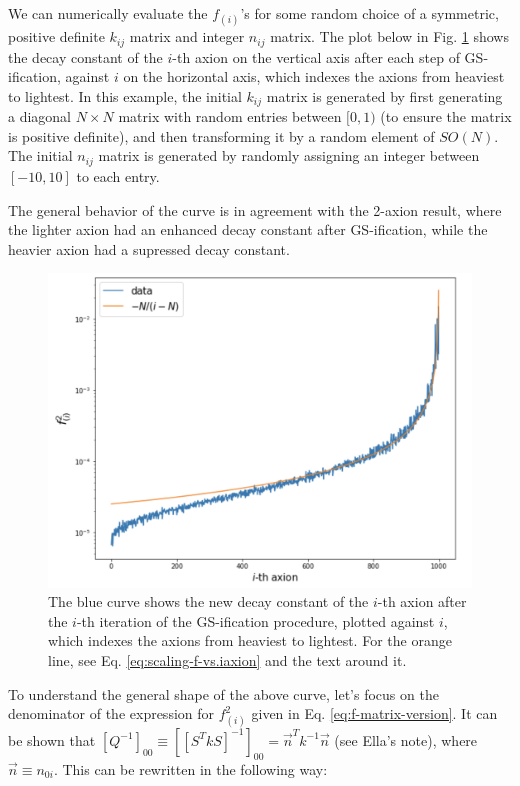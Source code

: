 \documentclass{article}
\begin{document}
We can numerically evaluate the $f_{(i)}$'s for some random choice of a symmetric, positive definite $k_{ij}$ matrix and integer $n_{ij}$ matrix. The plot below in Fig. \ref{fig:f-vs-axions} shows the decay constant of the $i$-th axion on the vertical axis after each step of GS-ification, against $i$ on the horizontal axis, which indexes the axions from heaviest to lightest. In this example, the initial $k_{ij}$ matrix is generated by first generating a diagonal $N\times N$ matrix with random entries between $[0,1)$ (to ensure the matrix is positive definite), and then transforming it by a random element of $SO(N)$. The initial $n_{ij}$ matrix is generated by randomly assigning an integer between $[-10,10]$ to each entry.

The general behavior of the curve is in agreement with the 2-axion result, where the lighter axion had an enhanced decay constant after GS-ification, while the heavier axion had a supressed decay constant.

\begin{figure}[h]
    \centering
    \includegraphics[width=0.9\linewidth]{figs/f-vs-axions.png}
    \caption{The blue curve shows the new decay constant of the $i$-th axion after the $i$-th iteration of the GS-ification procedure, plotted against $i$, which indexes the axions from heaviest to lightest. For the orange line, see Eq. \eqref{eq:scaling-f-vs.iaxion} and the text around it.}
    \label{fig:f-vs-axions}
\end{figure}

To understand the general shape of the above curve, let's focus on the denominator of the expression for $f_{(i)}^{2}$ given in Eq. \eqref{eq:f-matrix-version}. It can be shown that $[Q^{-1}]_{00} \equiv [[S^T k S]^{-1}]_{00} = \vec{n}^T k^{-1} \vec{n}$ (see Ella's note), where $\vec{n} \equiv n_{0i}$. This can be rewritten in the following way:
\end{document}
